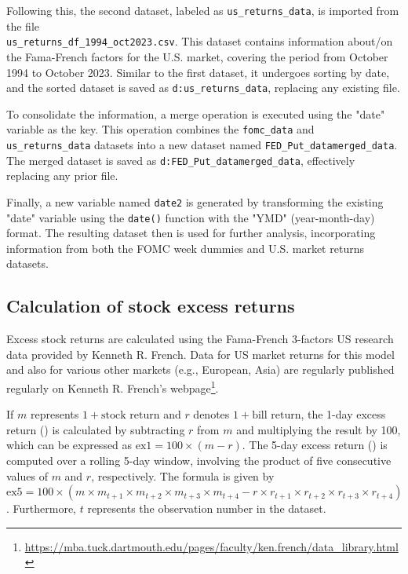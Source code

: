 Following this, the second dataset, labeled as \texttt{us\_returns\_data}, is imported from the file \\ \texttt{us\_returns\_df\_1994\_oct2023.csv}. This dataset contains information about/on the Fama-French factors for the U.S. market, covering the period from October 1994 to October 2023. Similar to the first dataset, it undergoes sorting by date, and the sorted dataset is saved as \texttt{d:us\_returns\_data}, replacing any existing file.

To consolidate the information, a merge operation is executed using the "date" variable as the key. This operation combines the \texttt{fomc\_data} and \texttt{us\_returns\_data} datasets into a new dataset named \texttt{FED\_Put\_datamerged\_data}. The merged dataset is saved as \texttt{d:FED\_Put\_datamerged\_data}, effectively replacing any prior file.

Finally, a new variable named \texttt{date2} is generated by transforming the existing "date" variable using the \texttt{date()} function with the "YMD" (year-month-day) format. The resulting dataset then is used for further analysis, incorporating information from both the FOMC week dummies and U.S. market returns datasets.

\subsection{Calculation of stock excess returns}

Excess stock returns are calculated using the Fama-French 3-factors US research data provided by Kenneth R. French.
Data for US market returns for this model and also for various other markets (e.g., European, Asia) are regularly published regularly on Kenneth R. French's webpage\footnote{\url{https://mba.tuck.dartmouth.edu/pages/faculty/ken.french/data_library.html}}.

If \(m\) represents \(1 + \text{{stock return}}\) and \(r\) denotes \(1 + \text{{bill return}}\), the 1-day excess return () is calculated by subtracting \(r\) from \(m\) and multiplying the result by 100, which can be expressed as \(\text{{ex1}} = 100 \times (m - r)\). 
The 5-day excess return () is computed over a rolling 5-day window, involving the product of five consecutive values of \(m\) and \(r\), respectively. The formula is given by \(\text{{ex5}} = 100 \times (m \times m_{t+1} \times m_{t+2} \times m_{t+3} \times m_{t+4} - r \times r_{t+1} \times r_{t+2} \times r_{t+3} \times r_{t+4})\).
Furthermore, \(t\) represents the observation number in the dataset. 

